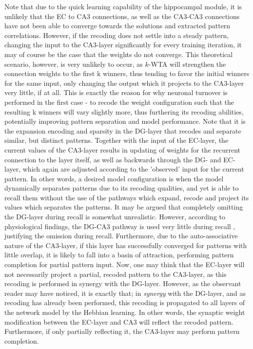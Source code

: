Note that due to the quick learning capability of the hippocampal module, it is unlikely that the EC to CA3 connections, as well as the CA3-CA3 connections have not been able to converge towards the solutions and extracted pattern correlations. However, if the recoding does not settle into a steady pattern, changing the input to the CA3-layer significantly for every training iteration, it may of course be the case that the weights do not converge. This theoretical scenario, however, is very unlikely to occur, as $k$-WTA will strengthen the connection weights to the first k winners, thus tending to favor the initial winners for the same input, only changing the output which it projects to the CA3-layer very little, if at all. 
This is exactly the reason for why neuronal turnover is performed in the first case - to recode the weight configuration such that the resulting k winners will vary slightly more, thus furthering its recoding abilities, potentially improving pattern separation and model performance. Note that it is the expansion encoding and sparsity in the DG-layer that recodes and separate similar, but distinct patterns. Together with the input of the EC-layer, the current values of the CA3-layer results in updating of weights for the recurrent connection to the layer itself, as well as backwards through the DG- and EC-layer, which again are adjusted according to the 'observed' input for the current pattern. In other words, a desired model configuration is when the model dynamically separates patterns due to its recoding qualities, and yet is able to recall them without the use of the pathways which expand, recode and project its values which separates the patterns.
It may be argued that completely omitting the DG-layer during recall is somewhat unrealistic. 
However, according to physiological findings, the DG-CA3 pathway is used very little during recall \citep{Wakagi2008}, justifying the omission during recall. 
Furthermore, due to the auto-associative nature of the CA3-layer, if this layer has successfully converged for patterns with little overlap, it is likely to fall into a basin of attraction, performing pattern completion for partial pattern input. Now, one may think that the EC-layer will not necessarily project a partial, recoded pattern to the CA3-layer, as this recoding is performed in synergy with the DG-layer. However, as the observant reader may have noticed, it is exactly that; in \textit{synergy} with the DG-layer, and as recoding has already been performed, this recoding is propagated to all layers of the network model by the Hebbian learning. In other words, the synaptic weight modification between the EC-layer and CA3 will reflect the recoded pattern. Furthermore, if only partially reflecting it, the CA3-layer may perform pattern completion.

